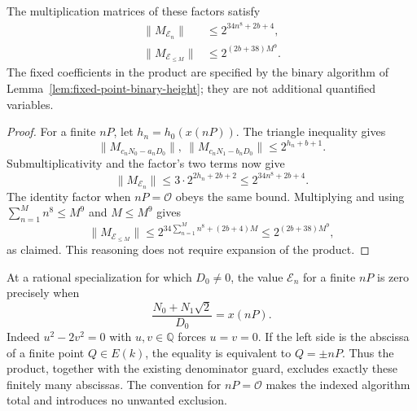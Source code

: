 \begin{proposition}\label{prop:fixed-exclusion-norm}
The multiplication matrices of these factors satisfy
\[
 \begin{aligned}
  \|M_{\mathcal E_n}\|&\le2^{34n^8+2b+4},\\
  \|M_{\mathcal E_{\le M}}\|&\le2^{(2b+38)M^9}.
 \end{aligned}
\]
The fixed coefficients in the product are specified by the binary
algorithm of Lemma~\ref{lem:fixed-point-binary-height}; they are not
additional quantified variables.
\end{proposition}
\begin{proof}
For a finite $nP$, let $h_n=h_0(x(nP))$.  The triangle inequality
gives
\[
 \|M_{c_nN_0-a_nD_0}\|,\ \|M_{c_nN_1-b_nD_0}\|
       \le2^{h_n+b+1}.
\]
Submultiplicativity and the factor's two terms now give
\[
 \|M_{\mathcal E_n}\|
     \le3\cdot2^{2h_n+2b+2}
     \le2^{34n^8+2b+4}.
\]
The identity factor when $nP=\mathcal O$ obeys the same bound.
Multiplying and using $\sum_{n=1}^M n^8\le M^9$ and $M\le M^9$
gives
\[
 \|M_{\mathcal E_{\le M}}\|
 \le2^{34\sum_{n=1}^M n^8+(2b+4)M}
 \le2^{(2b+38)M^9},
\]
as claimed.  This reasoning does not require expansion of the product.
\end{proof}

At a rational specialization for which $D_0\ne0$, the value
$\mathcal E_n$ for a finite $nP$ is zero precisely when
\[
               \frac{N_0+N_1\sqrt2}{D_0}=x(nP).
\]
Indeed $u^2-2v^2=0$ with $u,v\in\mathbb Q$ forces $u=v=0$.
If the left side is the abscissa of a finite point $Q\in E(k)$,
the equality is equivalent to $Q=\pm nP$.  Thus the product,
together with the existing denominator guard, excludes exactly these
finitely many abscissas.  The convention for $nP=\mathcal O$ makes
the indexed algorithm total and introduces no unwanted exclusion.
